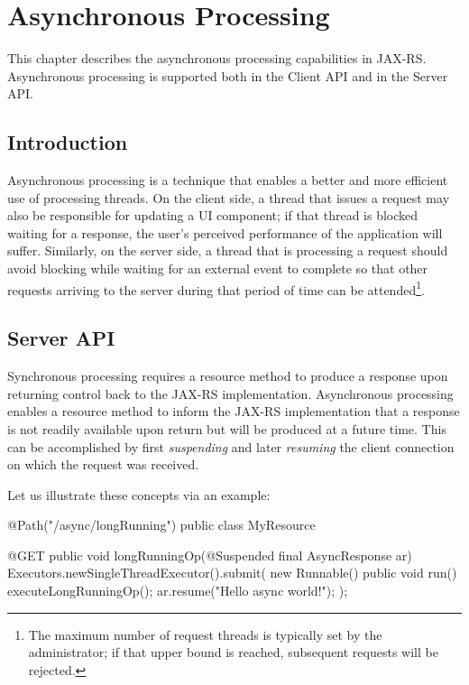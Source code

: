 \chapter{Asynchronous Processing}
\label{asynchronous_processing}

This chapter describes the asynchronous processing capabilities in JAX-RS. Asynchronous processing is supported both in the Client API and in the Server API.

\section{Introduction}
\label{introduction_async}

Asynchronous processing is a technique that enables a better and more efficient use of processing threads. On the client side, a thread that issues a request may also be responsible for updating a UI component; if that thread is blocked waiting for a response, the user's perceived performance of the application will suffer. Similarly, on the server side, a thread that is processing a request should avoid blocking while waiting for an external event to complete so that other requests arriving to the server during that period of time can be attended\footnote{The maximum number of request threads is typically set by the administrator; if that upper bound is reached, subsequent requests will be rejected.}.

\section{Server API}
\label{server_api}

Synchronous processing requires a resource method to produce a response upon returning control back to the JAX-RS implementation. Asynchronous processing enables a resource method to inform the JAX-RS implementation that a response is not readily available upon return but will be produced at a future time. This can be accomplished by first {\em suspending} and later {\em resuming} the client connection on which the request was received. 

Let us illustrate these concepts via an example:

\begin{listing}{1}
@Path("/async/longRunning")
public class MyResource {
    
    @GET
    public void longRunningOp(@Suspended final AsyncResponse ar) {
        Executors.newSingleThreadExecutor().submit(
            new Runnable() {
                public void run() {
                    executeLongRunningOp();
                    ar.resume("Hello async world!");
        } });
    } 
}
\end{listing}

